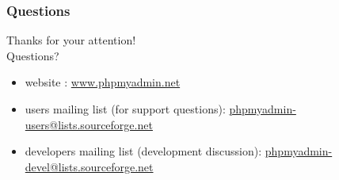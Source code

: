 \documentclass[14pt]{beamer}
\begin{document}
\begin{frame}
  \frametitle{Questions}
    Thanks for your attention!\\
    Questions?
    \begin{itemize}
      \item website : \href{http://www.phpmyadmin.net/}{www.phpmyadmin.net}
      \item users mailing list (for support questions): \href{mailto:phpmyadmin-users@lists.sourceforge.net}{phpmyadmin-users@lists.sourceforge.net}
      \item developers mailing list (development discussion): \href{mailto:phpmyadmin-devel@lists.sourceforge.net}{phpmyadmin-devel@lists.sourceforge.net}
    \end{itemize}
  \end{frame}
\end{document}
